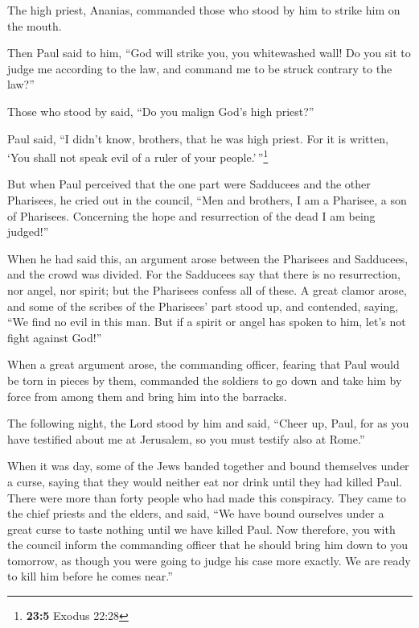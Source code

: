 \begin{paracol}{2}
\begin{otherlanguage}{english}
 The high priest, Ananias, commanded those who stood by
him to strike him on the mouth.

 Then Paul said to him, ``God will strike you, you
whitewashed wall! Do you sit to judge me according to the law, and
command me to be struck contrary to the law?''

 Those who stood by said, ``Do you malign God's high
priest?''

 Paul said, ``I didn't know, brothers, that he was high
priest. For it is written, `You shall not speak evil of a ruler of your
people.'\,''\footnote{\textbf{23:5} Exodus 22:28}

 But when Paul perceived that the one part were Sadducees
and the other Pharisees, he cried out in the council, ``Men and
brothers, I am a Pharisee, a son of Pharisees. Concerning the hope and
resurrection of the dead I am being judged!''

 When he had said this, an argument arose between the
Pharisees and Sadducees, and the crowd was divided.  For
the Sadducees say that there is no resurrection, nor angel, nor spirit;
but the Pharisees confess all of these.  A great clamor
arose, and some of the scribes of the Pharisees' part stood up, and
contended, saying, ``We find no evil in this man. But if a spirit or
angel has spoken to him, let's not fight against God!''

 When a great argument arose, the commanding officer,
fearing that Paul would be torn in pieces by them, commanded the
soldiers to go down and take him by force from among them and bring him
into the barracks.

 The following night, the Lord stood by him and said,
``Cheer up, Paul, for as you have testified about me at Jerusalem, so
you must testify also at Rome.''

 When it was day, some of the Jews banded together and
bound themselves under a curse, saying that they would neither eat nor
drink until they had killed Paul.  There were more than
forty people who had made this conspiracy.  They came to
the chief priests and the elders, and said, ``We have bound ourselves
under a great curse to taste nothing until we have killed Paul.
 Now therefore, you with the council inform the
commanding officer that he should bring him down to you tomorrow, as
though you were going to judge his case more exactly. We are ready to
kill him before he comes near.''


\end{otherlanguage}
\end{paracol}
